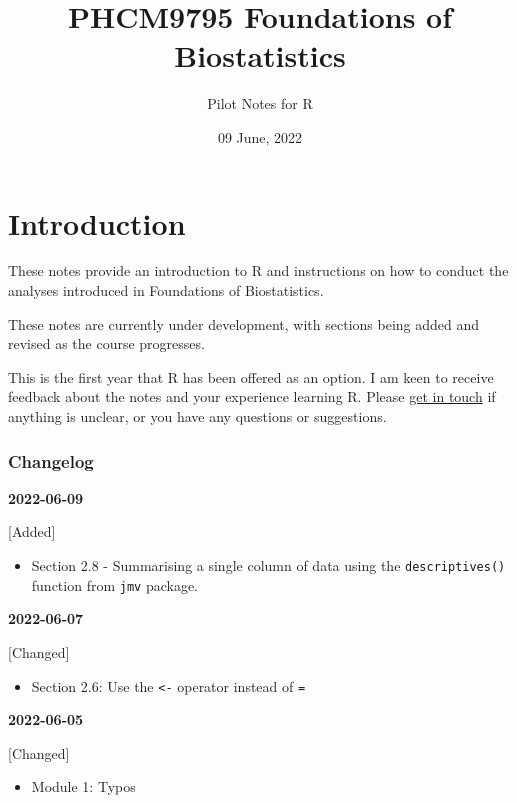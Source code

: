 \documentclass[
]{memoir}
\title{PHCM9795 Foundations of Biostatistics}
\author{Pilot Notes for R}
\date{09 June, 2022}
\providecommand{\tightlist}{%
  \setlength{\itemsep}{0pt}\setlength{\parskip}{0pt}}
\begin{document}
\maketitle

{
\setcounter{tocdepth}{1}
\tableofcontents
}
\hypertarget{introduction}{%
\chapter*{Introduction}\label{introduction}}

These notes provide an introduction to R and instructions on how to conduct the analyses introduced in Foundations of Biostatistics.

These notes are currently under development, with sections being added and revised as the course progresses.

This is the first year that R has been offered as an option. I am keen to receive feedback about the notes and your experience learning R. Please \href{mailto:t.dobbins@unsw.edu.au}{get in touch} if anything is unclear, or you have any questions or suggestions.

\hypertarget{changelog}{%
\subsection*{Changelog}\label{changelog}}

\textbf{2022-06-09}

{[}Added{]}

\begin{itemize}
\tightlist
\item
  Section 2.8 - Summarising a single column of data using the \texttt{descriptives()} function from \texttt{jmv} package.
\end{itemize}

\textbf{2022-06-07}

{[}Changed{]}

\begin{itemize}
\tightlist
\item
  Section 2.6: Use the \texttt{\textless{}-} operator instead of \texttt{=}
\end{itemize}

\textbf{2022-06-05}

{[}Changed{]}

\begin{itemize}
\tightlist
\item
  Module 1: Typos
\end{itemize}
\end{document}
